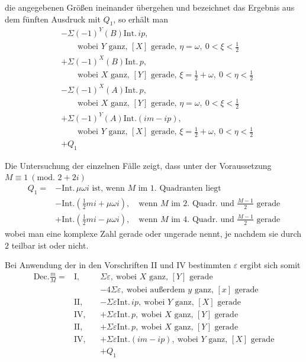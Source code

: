 die angegebenen Größen ineinander übergehen und bezeichnet das Ergebnis aus dem fünften Ausdruck mit $Q_1$, so erhält man
\[
\begin{aligned}
&-\Sigma(-1)^Y(B)\mathrm{Int.}\,ip,\\
&\qquad\text{wobei }Y\text{ ganz, }[X]\text{ gerade, }\eta=\omega,\ 0<\xi<\tfrac12\\
&+\Sigma(-1)^X(B)\mathrm{Int.}\,p,\\
&\qquad\text{wobei }X\text{ ganz, }[Y]\text{ gerade, }\xi=\tfrac12+\omega,\ 0<\eta<\tfrac12\\
&-\Sigma(-1)^X(A)\mathrm{Int.}\,p,\\
&\qquad\text{wobei }X\text{ ganz, }[Y]\text{ gerade, }\eta=\omega,\ 0<\xi<\tfrac12\\
&+\Sigma(-1)^Y(A)\mathrm{Int.}(im-ip),\\
&\qquad\text{wobei }Y\text{ ganz, }[X]\text{ gerade, }\xi=\tfrac12+\omega,\ 0<\eta<\tfrac12\\
&+Q_1
\end{aligned}
\]

Die Untersuchung der einzelnen Fälle zeigt, dass unter der Voraussetzung $M\equiv1\ (\text{mod. }2+2i)$
\[
\begin{aligned}
Q_1={}&-\mathrm{Int.}\,\mu\omega i\text{ ist, wenn }M\text{ im }1.\text{ Quadranten liegt}\\
&-\mathrm{Int.}(\tfrac12mi+\mu\omega i),\quad\text{wenn }M\text{ im }2.\text{ Quadr. und }\frac{M-1}{2}\text{ gerade}\\
&+\mathrm{Int.}(\tfrac12mi-\mu\omega i),\quad\text{wenn }M\text{ im }4.\text{ Quadr. und }\frac{M-1}{2}\text{ gerade}
\end{aligned}
\]
wobei man eine komplexe Zahl gerade oder ungerade nennt, je nachdem sie durch $2$ teilbar ist oder nicht.

Bei Anwendung der in den Vorschriften II und IV bestimmten $\varepsilon$ ergibt sich somit
\[
\begin{aligned}
\mathrm{Dec.}\frac mM={}&\mathrm{I},& &\Sigma\varepsilon,\ \text{wobei }X\text{ ganz, }[Y]\text{ gerade}\\
&&&-4\Sigma\varepsilon,\ \text{wobei außerdem }y\text{ ganz, }[x]\text{ gerade}\\
&\mathrm{II},&&-\Sigma\varepsilon\mathrm{Int.}\,ip,\ \text{wobei }Y\text{ ganz, }[X]\text{ gerade}\\
&\mathrm{IV},&&+\Sigma\varepsilon\mathrm{Int.}\,p,\ \text{wobei }X\text{ ganz, }[Y]\text{ gerade}\\
&\mathrm{II},&&+\Sigma\varepsilon\mathrm{Int.}\,p,\ \text{wobei }X\text{ ganz, }[Y]\text{ gerade}\\
&\mathrm{IV},&&+\Sigma\varepsilon\mathrm{Int.}(im-ip),\ \text{wobei }Y\text{ ganz, }[X]\text{ gerade}\\
&&&+Q_1
\end{aligned}
\]

